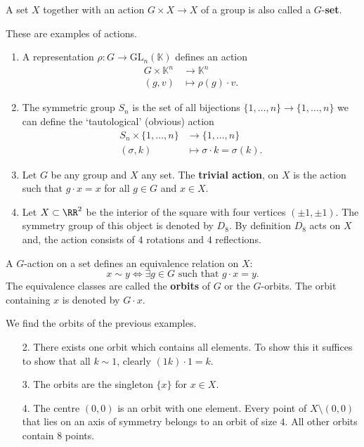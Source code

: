 \documentclass[12pt, a4paper]{article}
\newcommand{\gl}{\text{GL}}
\newcommand{\KK}{\mathbb{K}}
\begin{document}
\begin{definition}
    A set \(X\) together with an action \(G \times X \to X\) of a group is also called a \(G\)-\textbf{set}.
\end{definition}

\begin{mdexample}
    These are examples of actions.
    \begin{enumerate}
        \item A representation \(\rho : G \to \gl_n(\KK)\) defines an action 
        \[\begin{aligned}
            G \times \KK^n &\to \KK^n \\
            (g,v) &\mapsto \rho(g) \cdot v.
        \end{aligned}\]
        \item The symmetric group \(S_n\) is the set of all bijections \(\{1,\ldots,n\} \to \{1,\ldots,n\}\) we can define the `tautological' (obvious) action
        \[\begin{aligned}
            S_n \times \{1,\ldots,n\} &\to \{1,\ldots,n\} \\
            (\sigma,k) &\mapsto \sigma\cdot k=\sigma(k).
        \end{aligned}\]
        \item Let \(G\) be any group and \(X\) any set. The \textbf{trivial action}, on \(X\) is the action such that \(g \cdot x =x\) for all \(g\in G\) and \(x \in X\).
        \item Let \(X \subset \RR^2\) be the interior of the square with four vertices \((\pm 1,\pm 1)\). The symmetry group of this object is denoted by \(D_8\). By definition \(D_8\) acts on \(X\) and, the action consists of \(4\) rotations and \(4\) reflections.
    \end{enumerate}
\end{mdexample}

\begin{definition}
    A \(G\)-action on a set defines an equivalence relation on \(X\):
    \[x \sim y \iff \exists g\in G \text{ such that } g \cdot x =y.\]
    The equivalence classes are called the \textbf{orbits} of \(G\) or the \(G\)-orbits. The orbit containing \(x\) is denoted by \(G \cdot x\).
\end{definition}

\begin{example}
    We find the orbits of the previous examples.
    \begin{enumerate}
        \item[2.] There exists one orbit which contains all elements. To show this it suffices to show that all \(k \sim 1\), clearly \((1k)\cdot 1=k\).
        \item[3.] The orbits are the singleton \(\{x\}\) for \(x \in X\).
        \item[4.] The centre \((0,0)\) is an orbit with one element. Every point of \(X \setminus (0,0)\) that lies on an axis of symmetry belongs to an orbit of size \(4\). All other orbits contain \(8\) points.
    \end{enumerate}
\end{example}
\end{document}
